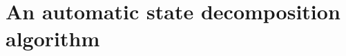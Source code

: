 \chapter{An automatic state decomposition algorithm}
\label{chapter:automatic-state-decomposition}








